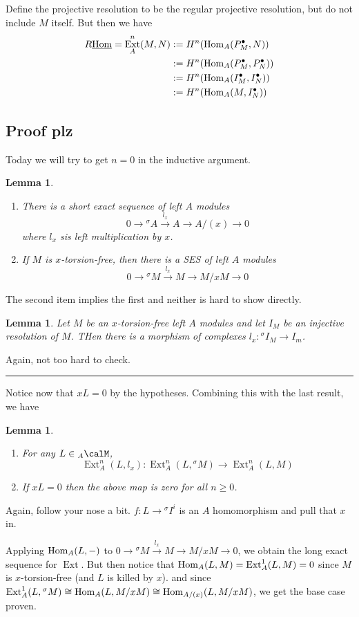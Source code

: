 \documentclass[12pt]{article}
\theoremstyle{break}
\theoremstyle{nonumberbreak}
\theoremstyle{changebreak}
\newtheorem{lem}[thm]{Lemma}
\theoremstyle{break}
\theoremstyle{nonumberbreak}
\theoremstyle{nonumberplain}
\theoremstyle{change}
\newcommand*{\brk}{
\rule{2in}{.1pt}
}
\DeclareMathOperator{\Ext}{Ext}
\newcommand*{\Hom}{\ensuremath\text{Hom}}
\begin{document}
Define the projective resolution to be the regular projective resolution, but do not include $M$ itself. But then we have
\begin{align*}
	R\underline{\Hom}=\Ext_A^n(M,N)&:=H^n(\Hom_A(P^\bullet_M,N))\\
	&:=H^n(\Hom_A(P_M^\bullet,P_N^\bullet))\\
	&:=H^n(\Hom_A(I_M^\bullet, I_N^\bullet))\\
	&:=H^n(\Hom_A(M,I_N^\bullet))
\end{align*}

\subsection{Proof plz}
Today we will try to get $n=0$ in the inductive argument.
\begin{lem}
	\begin{enumerate}
		\item  There is a short exact sequence of left $A$ modules
		\[0\to {^\sigma A}\xrightarrow{l_x}A\to A/(x)\to 0\]
		where $l_x$ sis left multiplication by $x$.
		\item If $M$ is $x$-torsion-free, then there is a SES of left $A$ modules
		\[0\to {^\sigma M}\xrightarrow{l_x}M\to M/xM\to 0\]
	\end{enumerate}
\end{lem}
The second item implies the first and neither is hard to show directly.
\begin{lem}
	Let $M$ be an $x$-torsion-free left $A$ modules and let $I_M$ be an injective resolution of $M$. THen there is a morphism of complexes
	$l_x:{^\sigma I_M}\to I_m$.
\end{lem}
Again, not too hard to check.

\brk

Notice now that $xL=0$ by the hypotheses. Combining this with the last result, we have
\begin{lem}
	\begin{enumerate}
		\item For any $L\in {_A\calM}$,
		\[\Ext_A^n(L,l_x):\Ext_A^n(L,{^\sigma M})\to \Ext_A^n(L,M)\]
		\item If $xL=0$ then the above map is zero for all $n\ge 0$.
	\end{enumerate}
\end{lem}
Again, follow your nose a bit. $f:L\to {^\sigma I^i}$ is an $A$ homomorphism and pull that $x$ in.

Applying $\Hom_A(L,-)$ to $0\to {^\sigma M}\xrightarrow{l_x}M\to M/xM\to 0$, we obtain the long exact sequence
for $\Ext$. But then notice that $\Hom_A(L,M)=\Ext_A^1(L,M)=0$ since $M$ is $x$-torsion-free (and $L$ is killed by $x$).
and since $\Ext_A^1(L,{^\sigma M})\cong \Hom_A(L,M/xM)\cong\Hom_{A/(x)}(L,M/xM)$, we get the base case proven.
\end{document}
